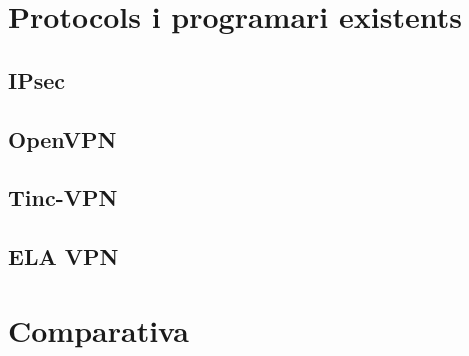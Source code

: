 \section{Protocols i programari existents}
\subsection{IPsec}
\subsection{OpenVPN}
\subsection{Tinc-VPN}
\subsection{ELA VPN}
\section{Comparativa}
